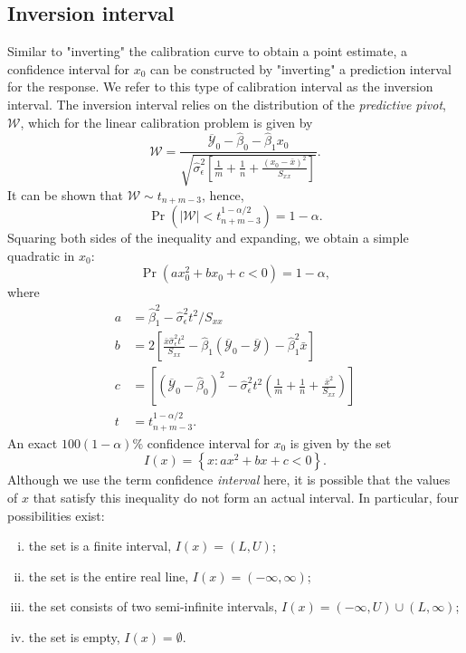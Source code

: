 \documentclass[cmfont,usenames,dvipsnames,leqno]{afit-etd}\usepackage[]{graphicx}\usepackage[]{color}
\newcommand{\mc}[1]{\ensuremath{\mathcal{#1}}}
\newcommand{\wh}[1]{\ensuremath{\widehat{#1}}}
\newcommand{\wb}[1]{\ensuremath{\overline{#1}}}
\newcommand{\Prob}{\operatorname{Pr}}
\begin{document}
\subsection{Inversion interval}
\label{sec:inversion-interval}
Similar to "inverting" the calibration curve to obtain a point estimate, a confidence interval for $x_0$ can be constructed by "inverting" a prediction interval for the response. We refer to this type of calibration interval as the inversion interval. The inversion interval relies on the distribution of the \textit{predictive pivot}, $\mc{W}$, which for the linear calibration problem is given by
\begin{equation}
\label{eqn:predictive-pivot}
  \mc{W} = \frac{\wb{\mc{Y}}_0-\wh{\beta}_0-\wh{\beta}_1 x_0}{\sqrt{\wh{\sigma}_\epsilon^2\left[\frac{1}{m}+\frac{1}{n}+\frac{(x_0-\bar{x})^2}{S_{xx}}\right]}}.
\end{equation}
It can be shown \citep{graybill_theory_1976} that $\mc{W} \sim t_{n+m-3}$, hence, 
\begin{equation*}
  \Prob\left(|\mc{W}| < t_{n+m-3}^{1-\alpha/2}\right) = 1 - \alpha. 
\end{equation*}
Squaring both sides of the inequality and expanding, we obtain a simple quadratic in $x_0$:
\begin{equation}
\label{eqn:quadratic}
  \Prob\left( a x_0^2 + b x_0 + c < 0 \right) = 1 - \alpha,
\end{equation}
where 
\begin{align*}
  a &= \wh{\beta}_1^2-\wh{\sigma}_\epsilon^2 t^2/S_{xx} \\
  b &= 2\left[\frac{\bar{x}\wh{\sigma}_\epsilon^2 t^2}{S_{xx}}-\wh{\beta}_1\left(\wb{\mc{Y}}_0-\wb{\mc{Y}}\right)-\wh{\beta}_1^2\bar{x}\right] \\
  c &= \left[\left(\wb{\mc{Y}}_0-\wh{\beta}_0\right)^2-\wh{\sigma}_\epsilon^2 t^2\left(\frac{1}{m}+\frac{1}{n}+\frac{\bar{x}^2}{S_{xx}}\right)\right] \\
  t &= t_{n+m-3}^{1-\alpha/2}.
\end{align*}
An exact $100(1 - \alpha)\%$ confidence interval for $x_0$ is given by the set
\begin{equation}
\label{eqn:quadratic-inequality}
  I(x) = \left\{x: a x^2 + b x + c < 0 \right\}.
\end{equation}
Although we use the term confidence \emph{interval} here, it is possible that the values of $x$ that satisfy this inequality do not form an actual interval. In particular, four possibilities exist: 
\begin{enumerate}[(i)]
  \item the set is a finite interval, $I(x) = (L, U)$; 
  \item the set is the entire real line, $I(x) = (-\infty, \infty)$; 
  \item the set consists of two semi-infinite intervals, $I(x) = (-\infty, U) \cup (L, \infty)$; 
  \item the set is empty, $I(x) = \emptyset$. 
\end{enumerate}
\end{document}

